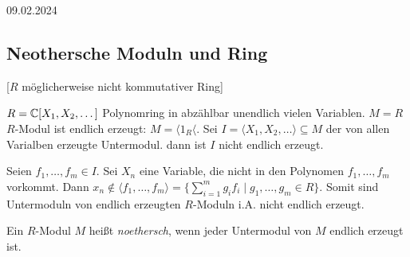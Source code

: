 \documentclass[../main.tex]{subfiles}
\begin{document}
\begin{flushright}
    09.02.2024
\end{flushright}
\subsection{Neothersche Moduln und Ring}
[$R$ möglicherweise nicht kommutativer Ring]
\begin{example}
    $R=\mathbb{C}[X_1, X_2,\dots]$ Polynomring in abzählbar unendlich vielen Variablen.
    $M=R$ $R$-Modul ist endlich erzeugt: $M=\langle 1_R\langle$.
    Sei $I=\langle X_1, X_2,\dots \rangle\subseteq M$ der von allen Varialben erzeugte Untermodul.
    dann ist $I$ nicht endlich erzeugt.
    
    Seien $f_1, \dots, f_m\in I$. Sei $X_n$ eine Variable, die nicht in den Polynomen $f_1,\dots, f_m$  vorkommt.
    Dann $x_n\notin \langle f_1,\dots,f_m\rangle = \{\sum_{i=1}^m g_i f_i \mid g_1,\dots, g_m\in R\}$.
    Somit sind Untermoduln von endlich erzeugten $R$-Moduln i.A. nicht endlich erzeugt.
\end{example}

\begin{definition}
    Ein $R$-Modul $M$ heißt \emph{noethersch}, wenn jeder Untermodul von $M$ endlich erzeugt ist.
\end{definition}
\end{document}
